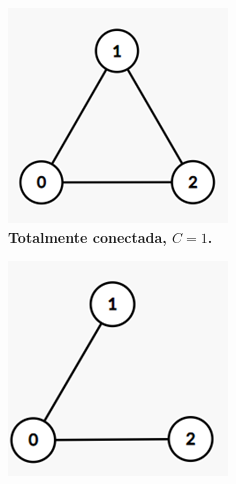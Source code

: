 \documentclass[
12pt,        %
oneside,     %
a4paper,     %
english,       %
brazil        %
%
%
]{ppgca}
\begin{document}
\begin{figure}[H]
\centering
    \begin{subfigure}[b]{0.4\textwidth}
        \includegraphics[width=\textwidth]{localcluster1.png}
        \centering
        \caption{\textbf{Totalmente conectada, $C = 1$.}}
        \label{fig:localcluster1}
    \end{subfigure}
    \hfill
    \begin{subfigure}[b]{0.4\textwidth}
        \includegraphics[width=\textwidth]{localcluster2.png}

\end{subfigure}
\end{figure}
\end{document}
